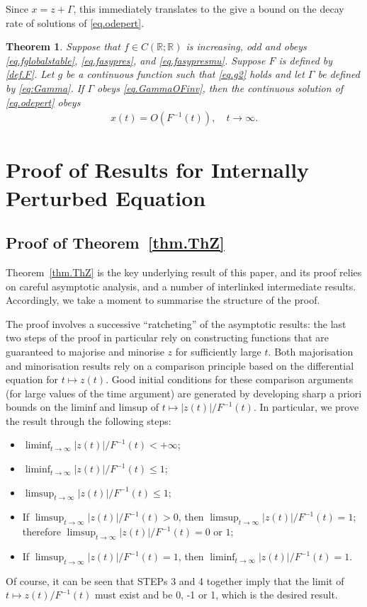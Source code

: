 \documentclass[a4paper,10pt,reqno]{amsart}
\numberwithin{equation}{section}
\newtheorem{theorem}{Theorem}
\theoremstyle{definition}
\theoremstyle{remark}
\DeclareMathOperator{\1}{\mathbbm 1}
\begin{document}
	Since $x=z+\Gamma$, this immediately translates to the give a bound on the decay rate of solutions of \eqref{eq.odepert}.
	\begin{theorem}\label{Txbdd}
		Suppose that $f\in C(\mathbb{R};\mathbb{R})$ is increasing, odd and obeys \eqref{eq.fglobalstable}, \eqref{eq.fasypres}, and \eqref{eq.fasypresmu}. Suppose $F$ is defined by \eqref{def.F}.  Let $g$ be a continuous function such that \eqref{eq.g2} holds and let $\Gamma$ be defined by \eqref{eq:Gamma}. 
		If $\Gamma$ obeys \eqref{eq.GammaOFinv}, then the continuous solution of \eqref{eq.odepert}  obeys 
		\begin{align*}
			x(t)=O(F^{-1}(t)), \quad t\to\infty. 
		\end{align*}
	\end{theorem}
	
	\section{Proof of Results for Internally Perturbed Equation}
	\subsection{Proof of Theorem~\ref{thm.ThZ}} 
	Theorem~\ref{thm.ThZ} is the key underlying result of this paper, and its proof relies on careful asymptotic analysis, and a number of interlinked intermediate results. Accordingly, we take a moment to summarise the structure of the proof. 
	
	The proof involves a successive ``ratcheting'' of the asymptotic results: the last two steps of the proof in particular rely on constructing functions 
	that are guaranteed to majorise and minorise $z$ for sufficiently large $t$. Both majorisation and minorisation results rely on a comparison principle based on the differential equation for $t\mapsto z(t)$. Good initial conditions for these comparison arguments (for large values of the time argument) are generated by developing sharp a priori bounds on the liminf and limsup of $t\mapsto |z(t)|/F^{-1}(t)$. In particular, we prove the result through the following steps:
	\begin{itemize}
		\item[STEP 1a:] $\liminf_{t\to\infty} |z(t)|/F^{-1}(t)<+\infty$;
		\item[STEP 1b:] $\liminf_{t\to\infty} |z(t)|/F^{-1}(t)\leq 1$;
		\item[STEP 2:] $\limsup_{t\to\infty} |z(t)|/F^{-1}(t)\leq 1$;
		\item[STEP 3:] If $\limsup_{t\to\infty} |z(t)|/F^{-1}(t)>0$, then $\limsup_{t\to\infty} |z(t)|/F^{-1}(t)=1$; therefore $\limsup_{t\to\infty} |z(t)|/F^{-1}(t)=0$ or $1$;
		\item[STEP 4:] If $\limsup_{t\to\infty} |z(t)|/F^{-1}(t)=1$, then $\liminf_{t\to\infty} |z(t)|/F^{-1}(t)=1$.
	\end{itemize}
	Of course, it can be seen that STEPs 3 and 4 together imply that the limit of $t\mapsto z(t)/F^{-1}(t)$ must exist and be 0, -1 or 1, which is the desired result.
	
\end{document}
